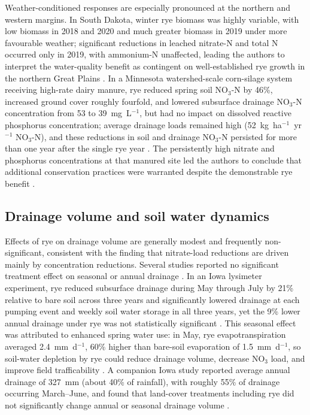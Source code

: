 \documentclass[11pt]{article}
\begin{document}
Weather-conditioned responses are especially pronounced at the northern and western margins. In South Dakota, winter rye biomass was highly variable, with low biomass in 2018 and 2020 and much greater biomass in 2019 under more favourable weather; significant reductions in leached nitrate-N and total N occurred only in 2019, with ammonium-N unaffected, leading the authors to interpret the water-quality benefit as contingent on well-established rye growth in the northern Great Plains \parencite{Bawa2023}. In a Minnesota watershed-scale corn-silage system receiving high-rate dairy manure, rye reduced spring soil NO$_3$-N by 46\%, increased ground cover roughly fourfold, and lowered subsurface drainage NO$_3$-N concentration from 53 to 39~mg~L$^{-1}$, but had no impact on dissolved reactive phosphorus concentration; average drainage loads remained high (52~kg~ha$^{-1}$~yr$^{-1}$ NO$_3$-N), and these reductions in soil and drainage NO$_3$-N persisted for more than one year after the single rye year \parencite{Krueger2013}. The persistently high nitrate and phosphorus concentrations at that manured site led the authors to conclude that additional conservation practices were warranted despite the demonstrable rye benefit \parencite{Krueger2013}.

\subsection{Drainage volume and soil water dynamics}
Effects of rye on drainage volume are generally modest and frequently non-significant, consistent with the finding that nitrate-load reductions are driven mainly by concentration reductions. Several studies reported no significant treatment effect on seasonal or annual drainage \parencite{Waring2020,Kaspar2012}. In an Iowa lysimeter experiment, rye reduced subsurface drainage during May through July by 21\% relative to bare soil across three years and significantly lowered drainage at each pumping event and weekly soil water storage in all three years, yet the 9\% lower annual drainage under rye was not statistically significant \parencite{Qi2010b}. This seasonal effect was attributed to enhanced spring water use: in May, rye evapotranspiration averaged 2.4~mm~d$^{-1}$, 60\% higher than bare-soil evaporation of 1.5~mm~d$^{-1}$, so soil-water depletion by rye could reduce drainage volume, decrease NO$_3$ load, and improve field trafficability \parencite{Qi2010b}. A companion Iowa study reported average annual drainage of 327~mm (about 40\% of rainfall), with roughly 55\% of drainage occurring March--June, and found that land-cover treatments including rye did not significantly change annual or seasonal drainage volume \parencite{Qi2011b}.
\end{document}
